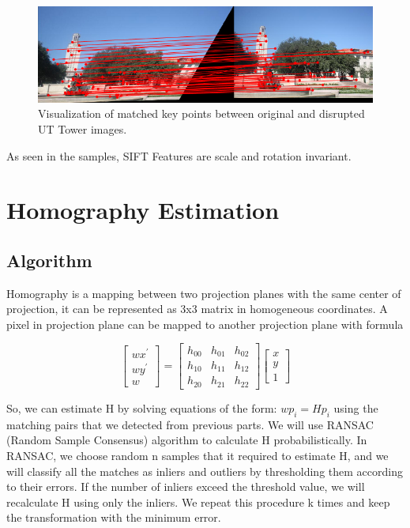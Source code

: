 \documentclass{article}
\begin{document}
\begin{figure}[!htb]
  \centering
  \includegraphics[width=.99\textwidth]{uttower2_2bad_match.png}
  \caption{Visualization of matched key points between original and disrupted UT Tower images.}
\end{figure}

As seen in the samples, SIFT Features are scale and rotation invariant.

\newpage

\section{Homography Estimation}

\subsection{Algorithm}
Homography is a mapping between two projection planes with the same center of projection, it can be represented as 3x3 matrix in homogeneous coordinates. A pixel in projection plane can be mapped to another projection plane with formula

$$
\begin{bmatrix} 
 wx^{'}  \\
 wy^{'}  \\
 w
\end{bmatrix}
=
\begin{bmatrix} 
  h_{00} & h_{01} & h_{02}  \\
   h_{10} & h_{11} & h_{12}  \\
    h_{20} & h_{21} & h_{22} 
\end{bmatrix}
\begin{bmatrix} 
 x \\
 y \\
 1
\end{bmatrix}
$$

So, we can estimate H by solving equations of the form: $wp_{i} = Hp_{i}$ using the matching pairs that we detected from previous parts. We will use RANSAC (Random Sample Consensus) algorithm to calculate H probabilistically. In RANSAC, we choose random n samples that it required to estimate H, and we will classify all the matches as inliers and outliers by thresholding them according to their errors. If the number of inliers exceed the threshold value, we will recalculate H using only the inliers. We repeat this procedure k times and keep the transformation with the minimum error.
\end{document}
